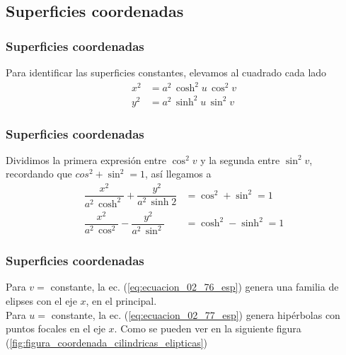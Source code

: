\subsection{Superficies coordenadas}
\begin{frame}
\frametitle{Superficies coordenadas}
Para identificar las superficies constantes, elevamos al cuadrado cada lado
\begin{align}
x^{2} &= a^{2} \, \cosh^{2} u \, \cos^{2} v \label{eq:ecuacion_02_74_esp} \\
y^{2} &= a^{2} \, \sinh^{2} u \, \sin^{2} v \label{eq:ecuacion_02_75_esp}
\end{align}
\end{frame}
\begin{frame}
\frametitle{Superficies coordenadas}
Dividimos la primera expresión entre $\cos^{2} v$ y la segunda entre $\sin^{2} v$, recordando que $cos^{2} + \sin^{2} = 1$, así llegamos a
\begin{align}
\dfrac{x^{2}}{a^{2} \, \cosh^{2}} + \dfrac{y^{2}}{a^{2} \, \sinh{2}} &= \cos^{2} + \sin^{2} = 1 \label{eq:ecuacion_02_76_esp}\\[1em]
\dfrac{x^{2}}{a^{2} \, \cos^{2}} - \dfrac{y^{2}}{a^{2} \, \sin^{2}} &= \cosh^{2} - \sinh^{2} = 1 \label{eq:ecuacion_02_77_esp}
\end{align}
\end{frame}
\begin{frame}
\frametitle{Superficies coordenadas}
Para $v=$ constante, la ec. (\ref{eq:ecuacion_02_76_esp}) genera una familia de elipses con el eje $x$, en el principal.
\\
\bigskip
Para $u=$ constante, la ec. (\ref{eq:ecuacion_02_77_esp}) genera hipérbolas con puntos focales en el eje $x$. Como se pueden ver en la siguiente figura (\ref{fig:figura_coordenada_cilindricas_elipticas})
\end{frame}
